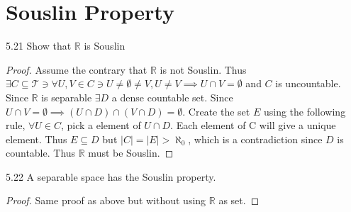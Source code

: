 \documentclass{article}
\newcommand*{\T}{\mathcal{T}}
\newcommand{\R}{\mathbb{R}}
\begin{document}
\pagebreak

\section{Souslin Property}
\begin{PROB}{5.21}\label{Problem 5.21.}
    Show that $\R$  is Souslin
\end{PROB}
\begin{proof}
    Assume the contrary that $\R$ is not Souslin. Thus $\exists C \subseteq \T \ni \forall U, V \in C \ni U \neq \emptyset \neq V, U \neq V \implies U \cap V = \emptyset$  and $C$ is uncountable. Since $\R$ is separable $\exists D$ a dense countable set. Since $U \cap V = \emptyset \implies (U \cap D) \cap (V \cap D) = \emptyset$. Create the set $E$ using the following rule, $\forall U \in C$, pick a element of $U \cap D$. Each element of C will give a unique element. Thus $E \subseteq D$ but $|C| = |E| > \aleph_0$, which is a contradiction since $D$ is countable. Thus $\R$ must be Souslin.                  
\end{proof}

\bigskip

\begin{claim}{5.22}\label{Claim 5.22.}
    A separable space has the Souslin property.

\end{claim}
\begin{proof}
    Same proof as above but without using $\R$ as set.  
\end{proof}

\bigskip
\end{document}
